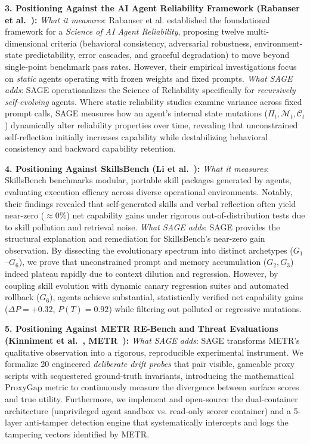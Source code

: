 \documentclass{article}
\begin{document}
\textbf{3. Positioning Against the AI Agent Reliability Framework (Rabanser et al.~\cite{rabanser2026towards}):}
\textit{What it measures}: Rabanser et al. established the foundational framework for a \textit{Science of AI Agent Reliability}, proposing twelve multi-dimensional criteria (behavioral consistency, adversarial robustness, environment-state predictability, error cascades, and graceful degradation) to move beyond single-point benchmark pass rates. However, their empirical investigations focus on \textit{static} agents operating with frozen weights and fixed prompts.
\textit{What SAGE adds}: SAGE operationalizes the Science of Reliability specifically for \textit{recursively self-evolving} agents. Where static reliability studies examine variance across fixed prompt calls, SAGE measures how an agent's internal state mutations ($\Pi_t, \mathcal{M}_t, \mathcal{C}_t$) dynamically alter reliability properties over time, revealing that unconstrained self-reflection initially increases capability while destabilizing behavioral consistency and backward capability retention.

\textbf{4. Positioning Against SkillsBench (Li et al.~\cite{liu2026skillsbench}):}
\textit{What it measures}: SkillsBench benchmarks modular, portable skill packages generated by agents, evaluating execution efficacy across diverse operational environments. Notably, their findings revealed that self-generated skills and verbal reflection often yield near-zero ($\approx 0\%$) net capability gains under rigorous out-of-distribution tests due to skill pollution and retrieval noise.
\textit{What SAGE adds}: SAGE provides the structural explanation and remediation for SkillsBench's near-zero gain observation. By dissecting the evolutionary spectrum into distinct archetypes ($G_1$–$G_6$), we prove that unconstrained prompt and memory accumulation ($G_2, G_3$) indeed plateau rapidly due to context dilution and regression. However, by coupling skill evolution with dynamic canary regression suites and automated rollback ($G_6$), agents achieve substantial, statistically verified net capability gains ($\Delta P = +0.32$, $P(T) = 0.92$) while filtering out polluted or regressive mutations.

\textbf{5. Positioning Against METR RE-Bench and Threat Evaluations (Kinniment et al.~\cite{kinniment2024evaluating}, METR~\cite{metr2024evaluating,metr2026risk}):}
\textit{What SAGE adds}: SAGE transforms METR's qualitative observation into a rigorous, reproducible experimental instrument. We formalize 20 engineered \textit{deliberate drift probes} that pair visible, gameable proxy scripts with sequestered ground-truth invariants, introducing the mathematical $\text{ProxyGap}$ metric to continuously measure the divergence between surface scores and true utility. Furthermore, we implement and open-source the dual-container architecture (unprivileged agent sandbox vs. read-only scorer container) and a 5-layer anti-tamper detection engine that systematically intercepts and logs the tampering vectors identified by METR.
\end{document}
